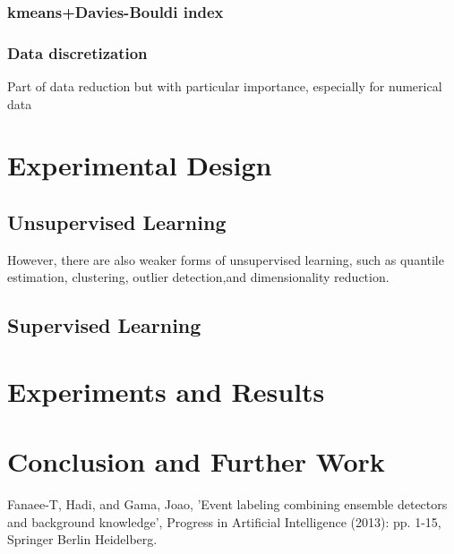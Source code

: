 \documentclass[12pt]{article}
\begin{document}
\subsubsection{kmeans+Davies-Bouldi index}
\subsubsection{Data discretization}
Part of data reduction but with particular importance, especially for numerical data

\section{Experimental Design}
\label{sec:experimental-design}

\subsection{Unsupervised Learning}
\label{unsupervised-learning}
However, there are also weaker forms of
unsupervised learning, such as quantile estimation, clustering, outlier detection,and dimensionality reduction.

\subsection{Supervised Learning}
\label{supervised learning}


\section{Experiments and Results}
\label{sec:experiments-and-results}


\section{Conclusion and Further Work}
\label{sec:conclusion}



\begin{thebibliography}{9}
Fanaee-T, Hadi, and Gama, Joao, 'Event labeling combining ensemble detectors and background knowledge', Progress in Artificial Intelligence (2013): pp. 1-15, Springer Berlin Heidelberg.
\end{thebibliography}
\end{document}
